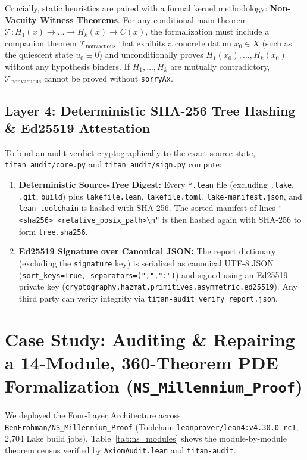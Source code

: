 \documentclass[11pt,a4paper]{article}
\theoremstyle{plain}
\theoremstyle{definition}
\begin{document}
Crucially, static heuristics are paired with a formal kernel methodology: \textbf{Non-Vacuity Witness Theorems}. For any conditional main theorem $\mathcal{T} : H_1(x) \to \dots \to H_k(x) \to C(x)$, the formalization must include a companion theorem $\mathcal{T}_{\text{nonvacuous}}$ that exhibits a concrete datum $x_0 \in X$ (such as the quiescent state $u_0 \equiv 0$) and unconditionally proves $H_1(x_0), \dots, H_k(x_0)$ without any hypothesis binders. If $H_1,\dots,H_k$ are mutually contradictory, $\mathcal{T}_{\text{nonvacuous}}$ cannot be proved without \texttt{sorryAx}.

\subsection{Layer 4: Deterministic SHA-256 Tree Hashing \& Ed25519 Attestation}\label{sec:layer4}

To bind an audit verdict cryptographically to the exact source state, \texttt{titan\_audit/core.py} and \texttt{titan\_audit/sign.py} compute:
\begin{enumerate}[nosep]
  \item \textbf{Deterministic Source-Tree Digest:} Every \texttt{*.lean} file (excluding \texttt{.lake}, \texttt{.git}, \texttt{build}) plus \texttt{lakefile.lean}, \texttt{lakefile.toml}, \texttt{lake-manifest.json}, and \texttt{lean-toolchain} is hashed with SHA-256. The sorted manifest of lines \texttt{"<sha256>  <relative\_posix\_path>\textbackslash n"} is then hashed again with SHA-256 to form \texttt{tree.sha256}.
  \item \textbf{Ed25519 Signature over Canonical JSON:} The report dictionary (excluding the \texttt{signature} key) is serialized as canonical UTF-8 JSON (\texttt{sort\_keys=True, separators=(",",":")}) and signed using an Ed25519 private key (\texttt{cryptography.hazmat.primitives.asymmetric.ed25519}). Any third party can verify integrity via \texttt{titan-audit verify report.json}.
\end{enumerate}

\section{Case Study: Auditing \& Repairing a 14-Module, 360-Theorem PDE Formalization (\texttt{NS\_Millennium\_Proof})}\label{sec:casestudy}

We deployed the Four-Layer Architecture across \texttt{BenFrohman/NS\_Millennium\_Proof} \cite{frohman2026ns} (Toolchain \texttt{leanprover/lean4:v4.30.0-rc1}, 2,704 Lake build jobs). Table~\ref{tab:ns_modules} shows the module-by-module theorem census verified by \texttt{AxiomAudit.lean} and \texttt{titan-audit}.
\end{document}
